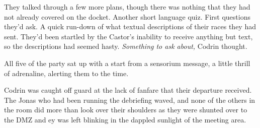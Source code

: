 They talked through a few more plans, though there was nothing that they had not already covered on the docket. Another short language quiz. First questions they'd ask. A quick run-down of what textual descriptions of their races they had sent. They'd been startled by the Castor's inability to receive anything but text, so the descriptions had seemed hasty. \emph{Something to ask about,} Codrin thought.

All five of the party sat up with a start from a sensorium message, a little thrill of adrenaline, alerting them to the time.

Codrin was caught off guard at the lack of fanfare that their departure received. The Jonas who had been running the debriefing waved, and none of the others in the room did more than look over their shoulders as they were shunted over to the DMZ and ey was left blinking in the dappled sunlight of the meeting area.
